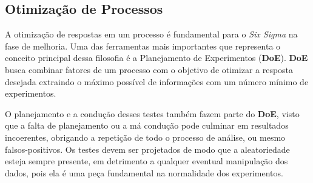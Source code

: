 \subsection{Otimização de Processos}

A otimização de respostas em um processo é fundamental para o \textit{Six Sigma} na fase de melhoria. Uma das ferramentas mais importantes que representa o conceito principal dessa filosofia é a Planejamento de Experimentos (\textbf{DoE}). \textbf{DoE} busca combinar fatores de um processo com o objetivo de otimizar a resposta desejada extraindo o máximo possível de informações com um número mínimo de experimentos. \cite{abepro}

O planejamento e a condução desses testes também fazem parte do \textbf{DoE}, visto que a falta de planejamento ou a má condução pode culminar em resultados incoerentes, obrigando a repetição de todo o processo de análise, ou mesmo falsos-positivos. Os testes devem ser projetados de modo que a aleatoriedade esteja sempre presente, em detrimento a qualquer eventual manipulação dos dados, pois ela é uma peça fundamental na normalidade dos experimentos.
